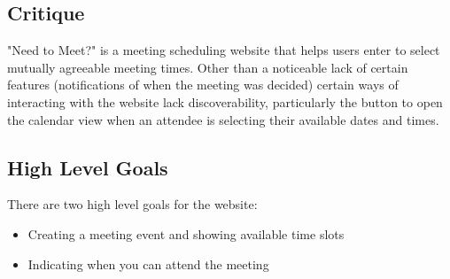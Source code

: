 \documentclass{sigchi}
\begin{document}
\subsection{Critique}
"Need to Meet?" is a meeting scheduling website that helps users
enter to select mutually agreeable meeting times. Other than a noticeable 
lack of certain features (notifications of when the meeting was decided)
certain ways of interacting with the website lack discoverability, particularly
the button to open the calendar view when an attendee is selecting their available
dates and times.
\subsection{High Level Goals}
There are two high level goals for the website:
\begin{itemize}
	\item Creating a meeting event and showing available time slots
	\item Indicating when you can attend the meeting
\end{itemize}
\end{document}
